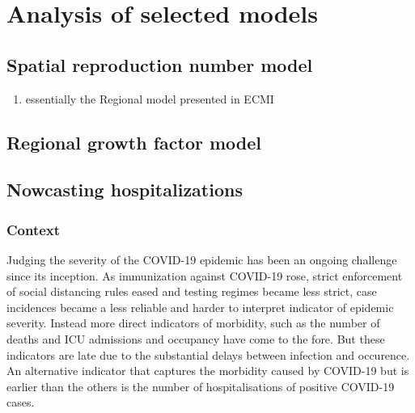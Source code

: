 \chapter{Analysis of selected models}
\label{cha:analysis_of_selected_models}

\section{Spatial reproduction number model}%
\label{sec:spatial_reproduction_number_model}

\begin{enumerate}
    \item essentially the Regional model presented in ECMI
\end{enumerate}

\section{Regional growth factor model}%
\label{sec:regional_growth_factor_model}

\section{Nowcasting hospitalizations}%
\label{sec:nowcasting_hospitalizations}
\subsection{Context}
Judging the severity of the COVID-19 epidemic has been an ongoing challenge since its inception. As immunization against COVID-19 rose, strict enforcement of social distancing rules eased and testing regimes became less strict, case incidences became a less reliable and harder to interpret indicator of epidemic severity. Instead more direct indicators of morbidity, such as the number of deaths and ICU admissions and occupancy have come to the fore. But these indicators are late due to the substantial delays between infection and occurence. An alternative indicator that captures the morbidity caused by COVID-19 but is earlier than the others is the number of hospitalisations of positive COVID-19
cases.

